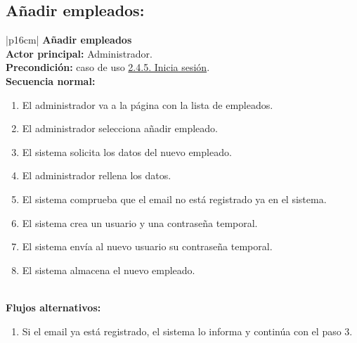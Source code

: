     \subsection{Añadir empleados:}
        \begin{longtable}{|p{16cm}|} 
        \hline
        \textbf{Añadir empleados} \\ \hline
        \textbf{Actor principal:} Administrador. \\ \hline
        \textbf{Precondición:} caso de uso \hyperref[subsec:2.4.5.]{2.4.5. Inicia sesión}. \\ \hline
        \textbf{Secuencia normal:} \\
        \begin{minipage}[t]{\linewidth}
            \begin{enumerate}
                \item El administrador va a la página con la lista de empleados.
                \item El administrador selecciona añadir empleado.
                \item El sistema solicita los datos del nuevo empleado.
                \item El administrador rellena los datos.
                \item El sistema comprueba que el email no está registrado ya en el sistema.
                \item El sistema crea un usuario y una contraseña temporal.
                \item El sistema envía al nuevo usuario su contraseña temporal.
                \item El sistema almacena el nuevo empleado.
            \end{enumerate}
            \vspace{1mm}
        \end{minipage} \\ \hline
        \textbf{Flujos alternativos:} \\
        \begin{minipage}[t]{\linewidth}
            \begin{enumerate}
                \item[5.a.] Si el email ya está registrado, el sistema lo informa y continúa con el paso 3.
            \end{enumerate}
            \vspace{1mm}
        \end{minipage} \\ \hline
        \caption{Descripción general del caso de uso - Añadir empleados.}
        \end{longtable}

